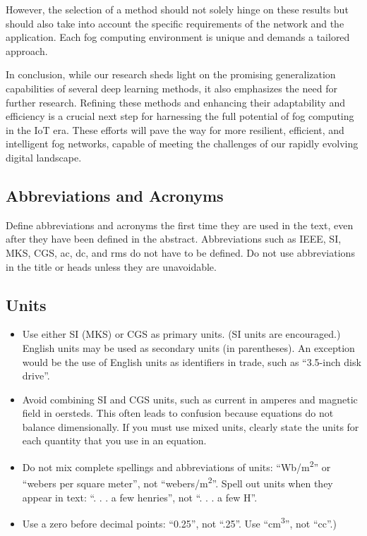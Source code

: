 \documentclass[conference]{IEEEtran}
\begin{document}
However, the selection of a method should not solely hinge on these results but should also take into account the specific requirements of the network and the application. Each fog computing environment is unique and demands a tailored approach.

In conclusion, while our research sheds light on the promising generalization capabilities of several deep learning methods, it also emphasizes the need for further research. Refining these methods and enhancing their adaptability and efficiency is a crucial next step for harnessing the full potential of fog computing in the IoT era. These efforts will pave the way for more resilient, efficient, and intelligent fog networks, capable of meeting the challenges of our rapidly evolving digital landscape.

\subsection{Abbreviations and Acronyms}\label{AA}
Define abbreviations and acronyms the first time they are used in the text, 
even after they have been defined in the abstract. Abbreviations such as 
IEEE, SI, MKS, CGS, ac, dc, and rms do not have to be defined. Do not use 
abbreviations in the title or heads unless they are unavoidable.

\subsection{Units}
\begin{itemize}
\item Use either SI (MKS) or CGS as primary units. (SI units are encouraged.) English units may be used as secondary units (in parentheses). An exception would be the use of English units as identifiers in trade, such as ``3.5-inch disk drive''.
\item Avoid combining SI and CGS units, such as current in amperes and magnetic field in oersteds. This often leads to confusion because equations do not balance dimensionally. If you must use mixed units, clearly state the units for each quantity that you use in an equation.
\item Do not mix complete spellings and abbreviations of units: ``Wb/m\textsuperscript{2}'' or ``webers per square meter'', not ``webers/m\textsuperscript{2}''. Spell out units when they appear in text: ``. . . a few henries'', not ``. . . a few H''.
\item Use a zero before decimal points: ``0.25'', not ``.25''. Use ``cm\textsuperscript{3}'', not ``cc''.)
\end{itemize}
\end{document}
